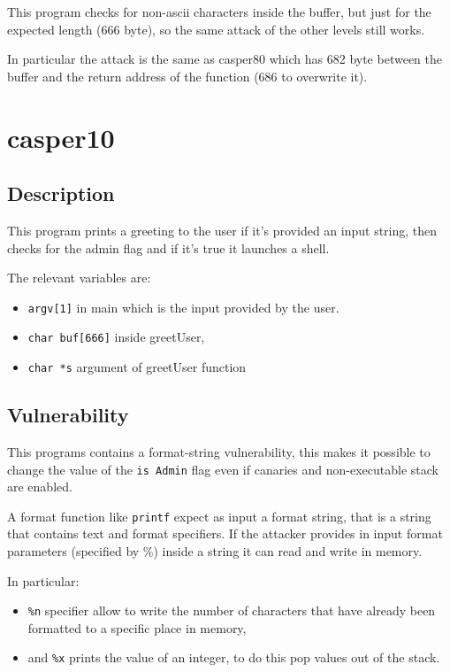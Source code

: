 \documentclass[a4paper,12pt]{article}
\begin{document}
This program checks for non-ascii characters inside the buffer, but just for the expected length (666 byte), so the same attack of the other levels still works.

In particular the attack is the same as casper80 which has 682 byte between the buffer and the return address of the function (686 to overwrite it).


\section{casper10}

\subsection{Description}
This program prints a greeting to the user if it's provided an input string, then checks for the admin flag and if it's true it launches a shell. 

The relevant variables are:
\begin{itemize}

\item \texttt{argv[1]} in main which is the input provided by the user.
\item \texttt{char buf[666]} inside greetUser,
\item \texttt{char *s} argument of greetUser function

\end{itemize}


\subsection{Vulnerability}

This programs contains a format-string vulnerability, this makes it possible to change the value of the \texttt{is Admin} flag even if canaries and non-executable stack are enabled.

A format function like \texttt{printf} expect as input a format string, that is a string that contains text and format specifiers. If the attacker provides in input format parameters (specified by \%) inside a string it can read and write in memory. 

In particular:
\begin{itemize}
\item \texttt{\%n} specifier allow to write the number of characters that have already been formatted to a specific place in memory,
\item and \texttt{\%x} prints the value of an integer, to do this pop values out of the stack.
\end{itemize} 
\end{document}
